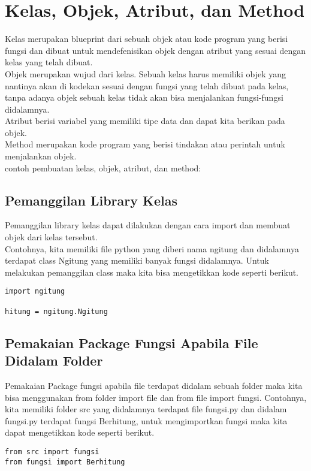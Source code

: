 \section{Kelas, Objek, Atribut, dan Method}
Kelas merupakan blueprint dari sebuah objek atau kode program yang berisi fungsi dan dibuat untuk mendefenisikan objek dengan atribut yang sesuai dengan kelas yang telah dibuat.\\
Objek merupakan wujud dari kelas. Sebuah kelas harus memiliki objek yang nantinya akan di kodekan sesuai dengan fungsi yang telah dibuat pada kelas, tanpa adanya objek sebuah kelas tidak akan bisa menjalankan fungsi-fungsi didalamnya.\\
Atribut berisi variabel yang memiliki tipe data dan dapat kita berikan pada objek.\\
Method merupakan kode program yang berisi tindakan atau perintah untuk menjalankan objek.\\
contoh pembuatan kelas, objek, atribut, dan method:


\subsection{Pemanggilan Library Kelas}
Pemanggilan library kelas dapat dilakukan dengan cara import dan membuat objek dari kelas tersebut.\\
Contohnya, kita memiliki file python yang diberi nama ngitung dan didalamnya terdapat class Ngitung yang memiliki banyak fungsi didalamnya. Untuk melakukan pemanggilan class maka kita bisa mengetikkan kode seperti berikut.
\begin{verbatim}
import ngitung

hitung = ngitung.Ngitung
\end{verbatim}

\subsection{Pemakaian Package Fungsi Apabila File Didalam Folder}
Pemakaian Package fungsi apabila file terdapat didalam sebuah folder maka kita bisa menggunakan from folder import file dan from file import fungsi. Contohnya, kita memiliki folder src yang didalamnya terdapat file fungsi.py dan didalam fungsi.py terdapat fungsi Berhitung, untuk mengimportkan fungsi maka kita dapat mengetikkan kode seperti berikut.
\begin{verbatim}
from src import fungsi
from fungsi import Berhitung
\end{verbatim}

